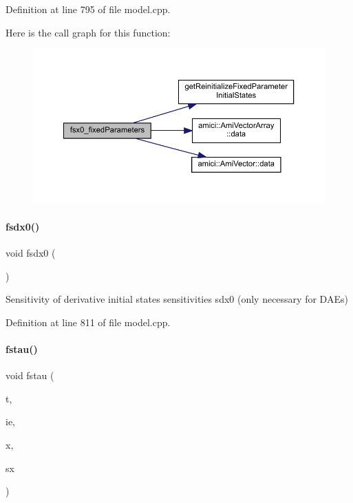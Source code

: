 Definition at line 795 of file model.\+cpp.

Here is the call graph for this function\+:
\nopagebreak
\begin{figure}[H]
\begin{center}
\leavevmode
\includegraphics[width=350pt]{classamici_1_1_model_acd951497e01220e545bbb238cc48e7bb_cgraph}
\end{center}
\end{figure}
\mbox{\label{classamici_1_1_model_a946b60982bd7321bcc2bdae10ea8358f}} 
\paragraph{\texorpdfstring{fsdx0()}{fsdx0()}}
{\footnotesize\ttfamily void fsdx0 (\begin{DoxyParamCaption}{ }\end{DoxyParamCaption})\hspace{0.3cm}{\ttfamily [virtual]}}

Sensitivity of derivative initial states sensitivities sdx0 (only necessary for D\+A\+Es) 

Definition at line 811 of file model.\+cpp.

\mbox{\label{classamici_1_1_model_a382cd2049c70f0dd4aafe483e4a50cff}} 
\paragraph{\texorpdfstring{fstau()}{fstau()}\hspace{0.1cm}{\footnotesize\ttfamily [1/2]}}
{\footnotesize\ttfamily void fstau (\begin{DoxyParamCaption}\item[{const \mbox{\hyperlink{namespaceamici_a1bdce28051d6a53868f7ccbf5f2c14a3}{realtype}}}]{t,  }\item[{const int}]{ie,  }\item[{const \mbox{\hyperlink{classamici_1_1_ami_vector}{Ami\+Vector}} $\ast$}]{x,  }\item[{const \mbox{\hyperlink{classamici_1_1_ami_vector_array}{Ami\+Vector\+Array}} $\ast$}]{sx }\end{DoxyParamCaption})}

